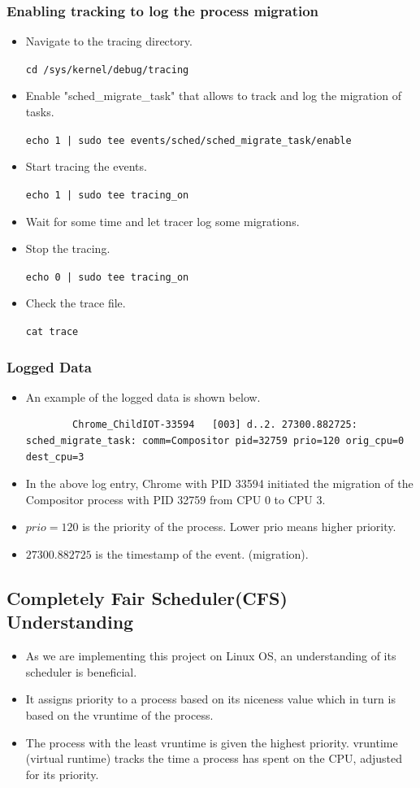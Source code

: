 \documentclass[12pt]{article}
\begin{document}
\subsubsection{Enabling tracking to log the process migration}
\begin{itemize}
    \item Navigate to the tracing directory. 
    
    \texttt{cd /sys/kernel/debug/tracing}
    \item Enable "sched\_migrate\_task" that allows to track and log the migration of tasks.
    
    \texttt{echo 1 | sudo tee events/sched/sched_migrate_task/enable}
    \item Start tracing the events. 
    
    \texttt{echo 1 | sudo tee tracing_on}
    \item Wait for some time and let tracer log some migrations.
    \item Stop the tracing. 
    
    \texttt{echo 0 | sudo tee tracing_on}
    \item Check the trace file. 
    
    \texttt{cat trace}
\end{itemize}
\subsubsection{Logged Data}
\begin{itemize}
    \item An example of the logged data is shown below.
    \begin{verbatim} 
        Chrome_ChildIOT-33594   [003] d..2. 27300.882725: sched_migrate_task: comm=Compositor pid=32759 prio=120 orig_cpu=0 dest_cpu=3
    \end{verbatim}
    \item In the above log entry, Chrome with PID 33594 initiated the migration of the Compositor process with PID 32759 from CPU 0 to CPU 3.
    \item $prio =120$ is the priority of the process. Lower prio means higher priority.
    \item $27300.882725$ is the timestamp of the event. (migration).
\end{itemize}
\subsection{Completely Fair Scheduler(CFS) Understanding}
\begin{itemize}
    \item As we are implementing this project on Linux OS, an understanding of its scheduler is beneficial.
    \item It assigns priority to a process based on its niceness value which in turn is based on the vruntime of the process.
    \item The process with the least vruntime is given the highest priority. vruntime (virtual runtime) tracks the time a process has spent on the CPU, adjusted for its priority.
\end{itemize}
\end{document}
